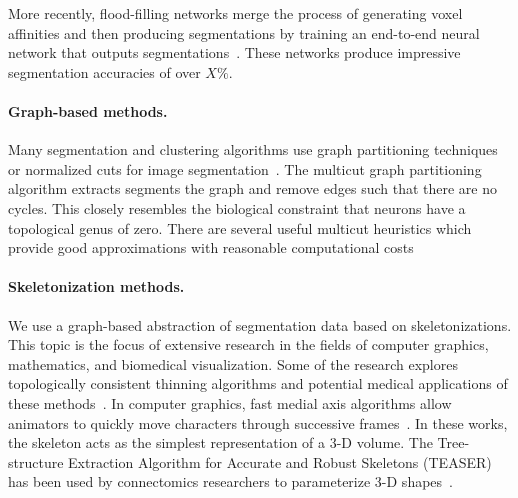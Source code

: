 More recently, flood-filling networks merge the process of generating voxel affinities and then producing segmentations by training an end-to-end neural network that outputs segmentations~\cite{januszewski2016flood}. 
These networks produce impressive segmentation accuracies of over $X\%$.%

\paragraph{Graph-based methods.} 
Many segmentation and clustering algorithms use graph partitioning techniques~\cite{andres2012globally} or normalized cuts for image segmentation~\cite{kappes2016higher,shi2000normalized,tatiraju2008image}. 
The multicut graph partitioning algorithm extracts segments the graph and remove edges such that there are no cycles. 
This closely resembles the biological constraint that neurons have a topological genus of zero. 
There are several useful multicut heuristics which provide good approximations with reasonable computational costs~\cite{horvnakova2017analysis,kernighan1970efficient,keuper2015efficient}

\paragraph{Skeletonization methods.} We use a graph-based abstraction of segmentation data based on skeletonizations. 
This topic is the focus of extensive research in the fields of computer graphics, mathematics, and biomedical visualization.
Some of the research explores topologically consistent thinning algorithms and potential medical applications of these methods~\cite{palagyi20003d,palagyi2001sequential}. 
In computer graphics, fast medial axis algorithms allow animators to quickly move characters through successive frames~\cite{baran2007automatic,bharaj2012automatically}. 
In these works, the skeleton acts as the simplest representation of a 3-D volume. 
The Tree-structure Extraction Algorithm for Accurate and Robust Skeletons (TEASER) has been used by connectomics researchers to parameterize 3-D shapes~\cite{sato2000teasar,zhao2014automatic}. 


